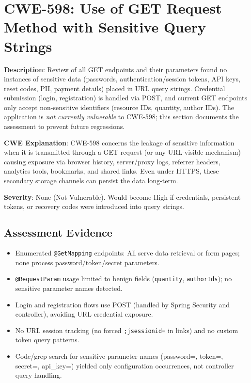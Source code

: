 \documentclass[]{UCD_CS_FYP_Report}
\begin{document}
\section{CWE-598: Use of GET Request Method with Sensitive Query Strings}

	\textbf{Description}: Review of all GET endpoints and their parameters found no instances of sensitive data (passwords, authentication/session tokens, API keys, reset codes, PII, payment details) placed in URL query strings. Credential submission (login, registration) is handled via POST, and current GET endpoints only accept non-sensitive identifiers (resource IDs, quantity, author IDs). The application is \emph{not currently vulnerable} to CWE-598; this section documents the assessment to prevent future regressions.

	\textbf{CWE Explanation}: CWE-598 concerns the leakage of sensitive information when it is transmitted through a GET request (or any URL-visible mechanism) causing exposure via browser history, server/proxy logs, referrer headers, analytics tools, bookmarks, and shared links. Even under HTTPS, these secondary storage channels can persist the data long-term.

	\textbf{Severity}: None (Not Vulnerable). Would become High if credentials, persistent tokens, or recovery codes were introduced into query strings.

\subsection*{Assessment Evidence}
\begin{itemize}
	\item Enumerated \texttt{@GetMapping} endpoints: All serve data retrieval or form pages; none process password/token/secret parameters.
	\item \texttt{@RequestParam} usage limited to benign fields (\texttt{quantity}, \texttt{authorIds}); no sensitive parameter names detected.
	\item Login and registration flows use POST (handled by Spring Security and controller), avoiding URL credential exposure.
	\item No URL session tracking (no forced \texttt{;jsessionid=} in links) and no custom token query patterns.
	\item Code/grep search for sensitive parameter names (password=, token=, secret=, api\_key=) yielded only configuration occurrences, not controller query handling.
\end{itemize}
\end{document}
